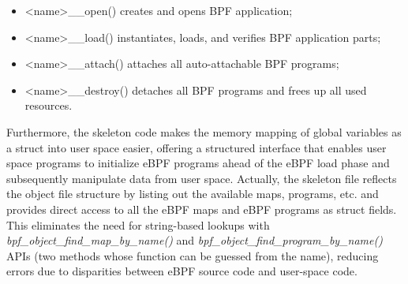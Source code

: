 \begin{itemize}
	\item <name>\_\_open() creates and opens BPF application;
	\item <name>\_\_load() instantiates, loads, and verifies BPF application parts;
	\item <name>\_\_attach() attaches all auto-attachable BPF programs;
	\item <name>\_\_destroy() detaches all BPF programs and frees up all used
		resources.
\end{itemize}

Furthermore, the skeleton code makes the memory mapping of global variables as a struct into user space easier, offering a structured interface that enables user space programs to initialize eBPF programs ahead of the eBPF load phase and subsequently manipulate data from user space.
Actually, the skeleton file reflects the object file structure by listing out the available maps, programs, etc. and provides direct access to all the eBPF maps and eBPF programs as struct fields. 
This eliminates the need for string-based lookups with \textit{bpf\_object\_find\_map\_by\_name()} and \textit{bpf\_object\_find\_program\_by\_name()} APIs (two methods whose function can be guessed from the name), reducing errors due to disparities between eBPF source code and user-space code.